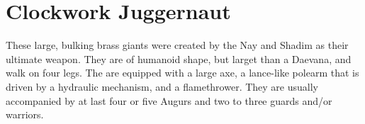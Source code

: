 \section{Clockwork Juggernaut}

These large, bulking brass giants were created by the Nay and Shadim as their ultimate weapon. They are of humanoid shape, but larget than a Daevana, and walk on four legs. The are equipped with a large axe, a lance-like polearm that is driven by a hydraulic mechanism, and a flamethrower. They are usually accompanied by at last four or five Augurs and two to three guards and/or warriors.